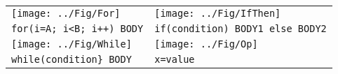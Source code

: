 
\begin{tabular}{|l|l|} \hline
\texttt{[image: ../Fig/For]}    & \texttt{[image: ../Fig/IfThen]}      \\ 
\verb-for(i=A; i<B; i++) BODY-  & \verb+if(condition) BODY1 else BODY2+\\ \hline

\texttt{[image: ../Fig/While]}	& \texttt{[image: ../Fig/Op]}	\\
\verb+while(condition} BODY+	& \verb+x=value+ 		\\ \hline
\end{tabular}



